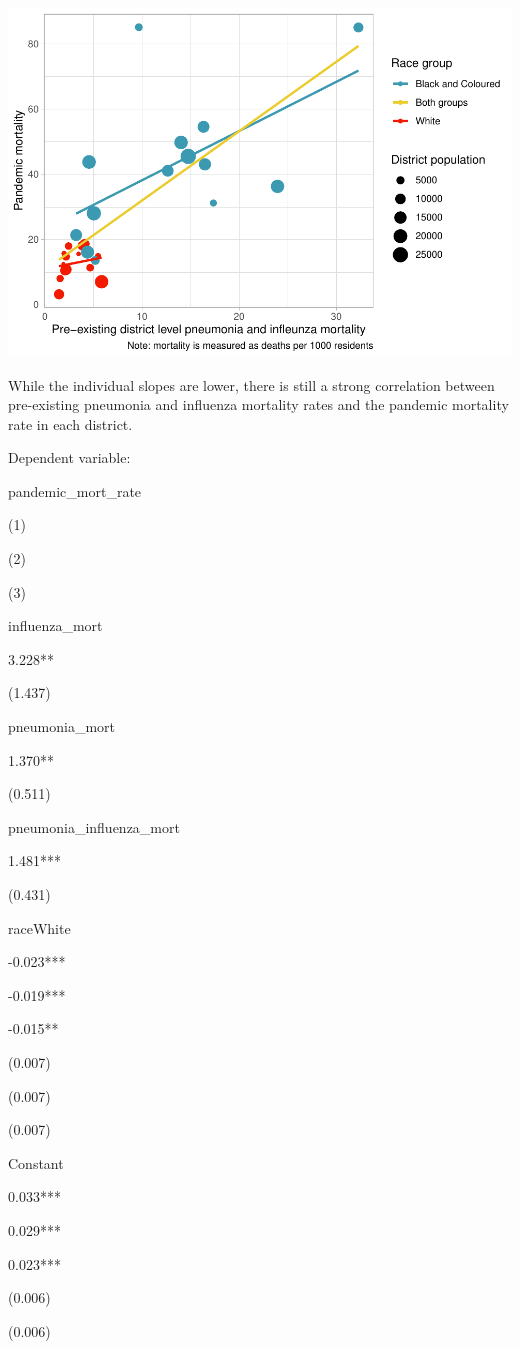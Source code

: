 \documentclass[fleqn,10pt,lineno]{wlpeerj} %
\begin{document}
\includegraphics{spanish-flu-mortality_bookdown_files/figure-latex/unnamed-chunk-17-1.pdf}

While the individual slopes are lower, there is still a strong correlation between pre-existing pneumonia and influenza mortality rates and the pandemic mortality rate in each district.

Dependent variable:

pandemic\_mort\_rate

(1)

(2)

(3)

influenza\_mort

3.228**

(1.437)

pneumonia\_mort

1.370**

(0.511)

pneumonia\_influenza\_mort

1.481***

(0.431)

raceWhite

-0.023***

-0.019***

-0.015**

(0.007)

(0.007)

(0.007)

Constant

0.033***

0.029***

0.023***

(0.006)

(0.006)
\end{document}
